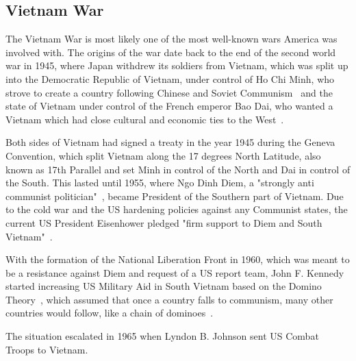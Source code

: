 \subsection{Vietnam War}
The Vietnam War is most likely one of the most well-known wars America was involved with.
The origins of the war date back to the end of the second world war in 1945, where Japan withdrew its soldiers from Vietnam, which was split up into the Democratic Republic of Vietnam, under control of Ho Chi Minh, who strove to create a country following Chinese and Soviet Communism~\cite{vietnam-war-history} and the state of Vietnam under control of the French emperor Bao Dai, who wanted a Vietnam which had close cultural and economic ties to the West~\cite{vietnam-war-history}.

Both sides of Vietnam had signed a treaty in the year 1945 during the Geneva Convention, which split Vietnam along the 17 degrees North Latitude, also known as 17th Parallel and set Minh in control of the North and Dai in control of the South. This lasted until 1955, where Ngo Dinh Diem, a "strongly anti communist politician"~\cite{vietnam-war-history}, became President of the Southern part of Vietnam. Due to the cold war and the US hardening policies against any Communist states, the current US President Eisenhower pledged "firm support to Diem and South Vietnam"~\cite{vietnam-war-history}.

With the formation of the National Liberation Front in 1960, which was meant to be a resistance against Diem and request of a US report team, John F. Kennedy started increasing US Military Aid in South Vietnam based on the Domino Theory~\cite{vietnam-war-history}, which assumed that once a country falls to communism, many other countries would follow, like a chain of dominoes~\cite{cold-war-domino-theory}.

The situation escalated in 1965 when Lyndon B. Johnson sent US Combat Troops to Vietnam.